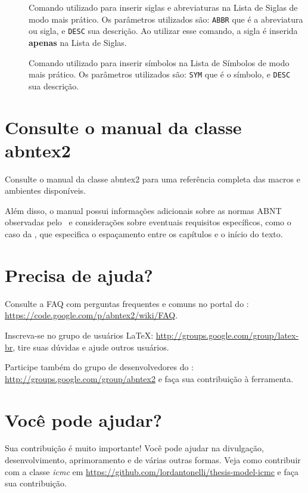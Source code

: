 \begin{description}
    \item[] Comando utilizado para inserir siglas e abreviaturas na Lista de Siglas de modo mais prático. Os parâmetros utilizados são: \texttt{ABBR} que é a abreviatura ou sigla, e \texttt{DESC} sua descrição. Ao utilizar esse comando, a sigla é inserida \textbf{apenas} na Lista de Siglas.
    \item[] Comando utilizado para inserir símbolos na Lista de Símbolos de modo mais prático. Os parâmetros utilizados são: \texttt{SYM} que é o símbolo, e \texttt{DESC} sua descrição. 
    
\end{description}


\section{Consulte o manual da classe \textsf{abntex2}}

Consulte o manual da classe \textsf{abntex2} \cite{abntex2classe} para uma
referência completa das macros e ambientes disponíveis. 

Além disso, o manual possui informações adicionais sobre as normas ABNT
observadas pelo \abnTeX\ e considerações sobre eventuais requisitos específicos, como o caso da , que
especifica o espaçamento entre os capítulos e o início do texto.



\section{Precisa de ajuda?}

Consulte a FAQ com perguntas frequentes e comuns no portal do \abnTeX:
\url{https://code.google.com/p/abntex2/wiki/FAQ}.

Inscreva-se no grupo de usuários \LaTeX:
\url{http://groups.google.com/group/latex-br}, tire suas dúvidas e ajude
outros usuários.

Participe também do grupo de desenvolvedores do \abnTeX:
\url{http://groups.google.com/group/abntex2} e faça sua contribuição à
ferramenta.


\section{Você pode ajudar?}

Sua contribuição é muito importante! Você pode ajudar na divulgação,
desenvolvimento, aprimoramento e de várias outras formas. Veja como contribuir com a classe \textit{icmc} em
\url{https://github.com/lordantonelli/thesis-model-icmc} e faça sua contribuição.
